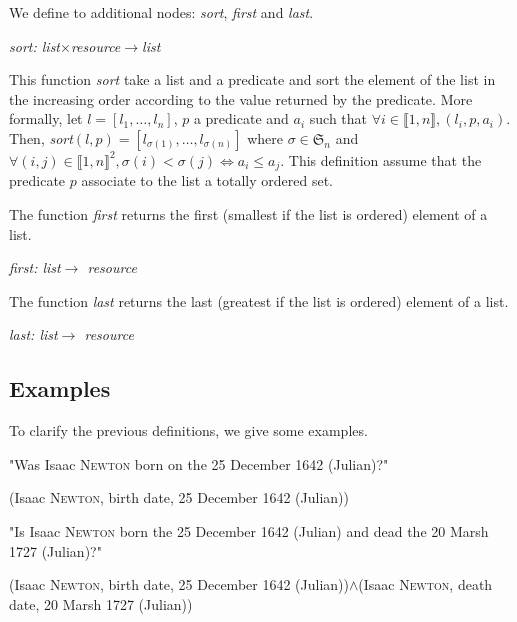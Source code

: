 We define to additional nodes: \textsl{sort}, \textsl{first} and \textsl{last}.

\begin{center}
\textsl{sort: list$\times$resource$\rightarrow$list}
\end{center}
This function \textsl{sort} take a list and a predicate and sort the element of the list in the increasing order according to the value returned by the predicate. More formally, let $l=[l_1,\ldots,l_n]$, $p$ a predicate and $a_i$ such that $\forall i\in\llbracket1,n\rrbracket, (l_i,p,a_i)$. Then, \textsl{sort}$(l,p) = [l_{\sigma(1)},\ldots,l_{\sigma(n)}]$ where $\sigma\in\mathfrak{S}_n$ and $\forall (i,j)\in\llbracket 1,n\rrbracket^2, \sigma(i)<\sigma(j) \Leftrightarrow a_i \leqslant a_j$. This definition assume that the predicate $p$ associate to the list a totally ordered set.

The function \textsl{first} returns the first (smallest if the list is ordered) element of a list.

\begin{center}
\textsl{first: list$\rightarrow$ resource}
\end{center}

The function \textsl{last} returns the last (greatest if the list is ordered) element of a list.

\begin{center}
\textsl{last: list$\rightarrow$ resource}
\end{center}

\subsection{Examples}

To clarify the previous definitions, we give some examples.

\bigskip

"Was Isaac \textsc{Newton} born on the 25 December 1642 (Julian)?"
\begin{center}(Isaac \textsc{Newton}, birth date, 25 December 1642 (Julian))\end{center}

\bigskip

"Is Isaac \textsc{Newton} born the 25 December 1642 (Julian) and dead the 20 Marsh 1727 (Julian)?"
\begin{center}(Isaac \textsc{Newton}, birth date, 25 December 1642 (Julian))$\wedge$(Isaac \textsc{Newton}, death date, 20 Marsh 1727 (Julian))\end{center}

